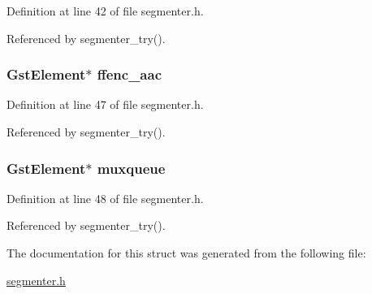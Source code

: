 \-Definition at line 42 of file segmenter.\-h.



\-Referenced by segmenter\-\_\-try().

\hypertarget{struct__audio__bag_a424c95ed83262d5926c84a1ac8698a8a}{
\subsubsection[{ffenc\-\_\-aac}]{\setlength{\rightskip}{0pt plus 5cm}\-Gst\-Element$\ast$ {\bf ffenc\-\_\-aac}}}\label{struct__audio__bag_a424c95ed83262d5926c84a1ac8698a8a}


\-Definition at line 47 of file segmenter.\-h.



\-Referenced by segmenter\-\_\-try().

\hypertarget{struct__audio__bag_a917a2aa09433aafbcda72454d53c196f}{
\subsubsection[{muxqueue}]{\setlength{\rightskip}{0pt plus 5cm}\-Gst\-Element$\ast$ {\bf muxqueue}}}\label{struct__audio__bag_a917a2aa09433aafbcda72454d53c196f}


\-Definition at line 48 of file segmenter.\-h.



\-Referenced by segmenter\-\_\-try().



\-The documentation for this struct was generated from the following file\-:\begin{DoxyCompactItemize}
\item 
\hyperlink{segmenter_8h}{segmenter.\-h}\end{DoxyCompactItemize}

